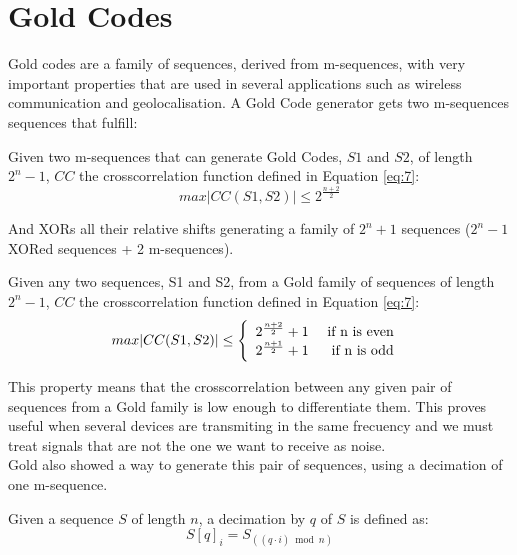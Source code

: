 \section{Gold Codes}

Gold codes\cite{gold_codes} are a family of sequences, derived from
m-sequences, with very important properties that are used in several
applications such as wireless communication and geolocalisation. A Gold Code
generator gets two m-sequences sequences that fulfill:

\begin{property}
  Given two m-sequences that can generate Gold Codes, $S1$ and $S2$, of length
  $2^{n}-1$, $CC$ the crosscorrelation function defined in Equation \eqref{eq:7}:
    \begin{equation}\label{gold:eq:1}
      max |CC(S1, S2)| \leq 2^{\frac{n+2}{2}}
    \end{equation}
\end{property}

And XORs all their relative shifts generating a family of $2^{n} + 1$ sequences
($2^{n} - 1$ XORed sequences + 2 m-sequences).

\begin{property}
  Given any two sequences, S1 and S2, from a Gold family of sequences of length
  $2^{n}-1$, $CC$ the crosscorrelation function defined in Equation \eqref{eq:7}:
  \begin{equation}
        max |CC(S1, S2)| \leq \left\{\begin{array}{lr}
            2^{\frac{n+2}{2}}+1 & \textnormal{ if n is even } \\
            2^{\frac{n+1}{2}}+1 & \textnormal{ if n is odd } \\
        \end{array}\right.
  \end{equation}
\end{property}


This property means that the crosscorrelation between any given pair of
sequences from a Gold family is low enough to differentiate them. This proves
useful when several devices are transmiting in the same frecuency and we must
treat signals that are not the one we want to receive as noise.\\

Gold also showed  a way to generate this pair of sequences,
using a decimation of one m-sequence.

\begin{definition}[Decimation]
  Given a sequence $S$ of length $n$, a decimation by $q$ of $S$ is defined as:
  \begin{equation}
    S[q]_{i} = S_{((q·i) \bmod n)}
  \end{equation}
\end{definition}

